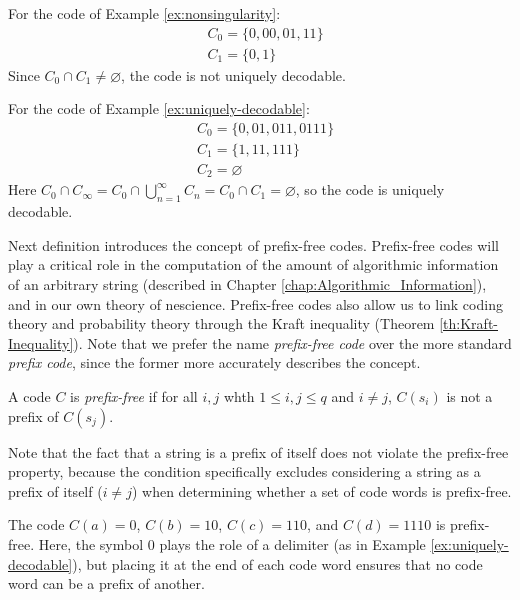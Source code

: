 \begin{example}
For the code of Example \ref{ex:nonsingularity}:
\begin{align*}
 & C_0 = \{0, 00, 01, 11\} \\
 & C_1 = \{0, 1\}
\end{align*}
Since $C_0 \cap C_1 \neq \varnothing$, the code is not uniquely decodable.

For the code of Example \ref{ex:uniquely-decodable}:
\begin{align*}
 & C_0 = \{0, 01, 011, 0111\} \\
 & C_1 = \{1, 11, 111\} \\
 & C_2 = \varnothing
\end{align*}
Here $C_0 \cap C_\infty = C_0 \cap \bigcup^\infty_{n=1} C_n = C_0 \cap C_1 = \varnothing$, so the code is uniquely decodable.
\end{example}

Next definition introduces the concept of prefix-free codes. Prefix-free codes will play a critical role in the computation of the amount of algorithmic information of an arbitrary string (described in Chapter \ref{chap:Algorithmic_Information}), and in our own theory of nescience. Prefix-free codes also allow us to link coding theory and probability theory through the Kraft inequality (Theorem \ref{th:Kraft-Inequality}). Note that we prefer the name \emph{prefix-free code} over the more standard \emph{prefix code}, since the former more accurately describes the concept.

\begin{definition}
\label{def:Prefix-free-Code}
A code $C$ is \emph{prefix-free} if for all $i, j$ whth $1 \leq i, j \leq q$ and $i \neq j$, $C(s_i)$ is not a prefix of $C(s_j)$.
\end{definition}

Note that the fact that a string is a prefix of itself does not violate the prefix-free property, because the condition specifically excludes considering a string as a prefix of itself ($i \neq j$) when determining whether a set of code words is prefix-free.

\begin{example}
\label{ex:prefix-free}
The code $C(a)=0$, $C(b)=10$, $C(c)=110$, and $C(d)=1110$ is prefix-free. Here, the symbol $0$ plays the role of a delimiter (as in Example \ref{ex:uniquely-decodable}), but placing it at the end of each code word ensures that no code word can be a prefix of another.
\end{example}

